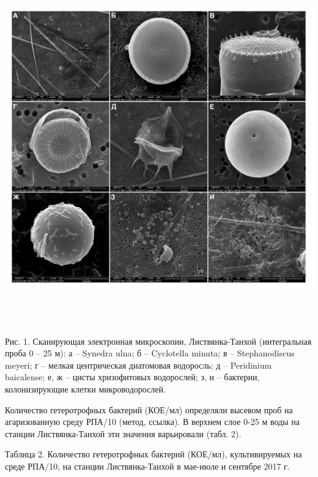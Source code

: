 \documentclass[a4paper,12pt,openany,final]{extreport}
\begin{document}
\includegraphics[width=6.50208in,height=6in]{media/image3.jpeg}

Рис. 1. Сканирующая электронная микроскопии, Листвянка-Танхой
(интегральная проба 0 -- 25 м): а -- Synedra ulna; б -- Cyclotella
minuta; в -- Stephanodiscus meyeri; г -- мелкая центрическая диатомовая
водоросль; д -- Peridinium baicalense; е, ж -- цисты хризофитовых
водорослей; з, и -- бактерии, колонизирующие клетки микроводорослей.

Количество гетеротрофных бактерий (КОЕ/мл) определяли высевом проб на
агаризованную среду РПА/10 (метод, ссылка). В верхнем слое 0-25 м воды
на станции Листвянка-Танхой эти значения варьировали (табл. 2).

Таблица 2. Количество гетеротрофных бактерий (КОЕ/мл), культивируемых на
среде РПА/10, на станции Листвянка-Танхой в мае-июле и сентябре 2017 г.
\end{document}
